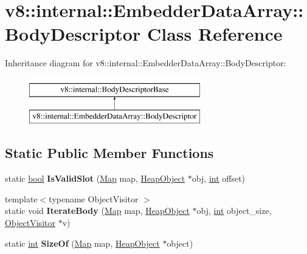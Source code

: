 \hypertarget{classv8_1_1internal_1_1EmbedderDataArray_1_1BodyDescriptor}{}\section{v8\+:\+:internal\+:\+:Embedder\+Data\+Array\+:\+:Body\+Descriptor Class Reference}
\label{classv8_1_1internal_1_1EmbedderDataArray_1_1BodyDescriptor}
Inheritance diagram for v8\+:\+:internal\+:\+:Embedder\+Data\+Array\+:\+:Body\+Descriptor\+:\begin{figure}[H]
\begin{center}
\leavevmode
\includegraphics[height=2.000000cm]{classv8_1_1internal_1_1EmbedderDataArray_1_1BodyDescriptor}
\end{center}
\end{figure}
\subsection*{Static Public Member Functions}
\begin{DoxyCompactItemize}
\item 
\mbox{\label{classv8_1_1internal_1_1EmbedderDataArray_1_1BodyDescriptor_aaf57df08208cb6b4a08d82afc6a3d9c7}} 
static \mbox{\hyperlink{classbool}{bool}} {\bfseries Is\+Valid\+Slot} (\mbox{\hyperlink{classv8_1_1internal_1_1Map}{Map}} map, \mbox{\hyperlink{classv8_1_1internal_1_1HeapObject}{Heap\+Object}} $\ast$obj, \mbox{\hyperlink{classint}{int}} offset)
\item 
\mbox{\label{classv8_1_1internal_1_1EmbedderDataArray_1_1BodyDescriptor_a3008a964a87d780119b7d008293b064d}} 
{\footnotesize template$<$typename Object\+Visitor $>$ }\\static void {\bfseries Iterate\+Body} (\mbox{\hyperlink{classv8_1_1internal_1_1Map}{Map}} map, \mbox{\hyperlink{classv8_1_1internal_1_1HeapObject}{Heap\+Object}} $\ast$obj, \mbox{\hyperlink{classint}{int}} object\+\_\+size, \mbox{\hyperlink{classv8_1_1internal_1_1ObjectVisitor}{Object\+Visitor}} $\ast$v)
\item 
\mbox{\label{classv8_1_1internal_1_1EmbedderDataArray_1_1BodyDescriptor_a1cc1bfd0ce8a8f1bbc11889a2d361b81}} 
static \mbox{\hyperlink{classint}{int}} {\bfseries Size\+Of} (\mbox{\hyperlink{classv8_1_1internal_1_1Map}{Map}} map, \mbox{\hyperlink{classv8_1_1internal_1_1HeapObject}{Heap\+Object}} $\ast$object)
\end{DoxyCompactItemize}
